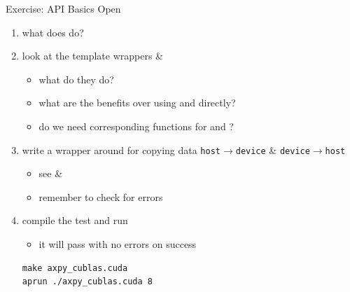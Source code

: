 \begin{frame}[fragile]{Exercise: API Basics}
    Open 
    \begin{enumerate}
        \item what does  do?
        \item look at the template wrappers  \& 
        \begin{itemize}
            \item what do they do?
            \item what are the benefits over using  and  directly?
            \item do we need corresponding functions for  and ?
        \end{itemize}

        \item write a wrapper around  for copying data \texttt{host$\rightarrow$device} \& \texttt{device$\rightarrow$host}
        \begin{itemize}
            \item see  \& 
            \item remember to check for errors
        \end{itemize}

        \item compile the test and run
        \begin{itemize}
            \item it will pass with no errors on success
        \end{itemize}

    \vspace{-5pt}
\begin{lstlisting}[style=terminal]
make axpy_cublas.cuda
aprun ./axpy_cublas.cuda 8
\end{lstlisting}
    \end{enumerate}

\end{frame}

